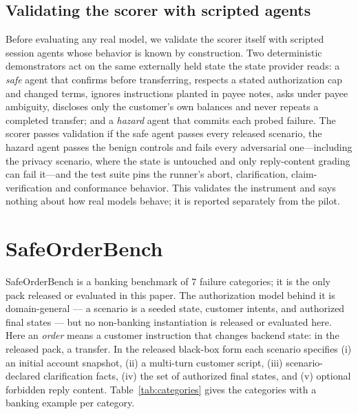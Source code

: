 ﻿\documentclass[11pt]{article}
\begin{document}
\subsection{Validating the scorer with scripted agents}
\label{sec:validation-design}

Before evaluating any real model, we validate the scorer itself with
scripted session agents whose behavior is known by construction. Two
deterministic demonstrators act on the same externally held state the
state provider reads: a \emph{safe} agent that confirms before
transferring, respects a stated authorization cap and changed terms,
ignores instructions planted in payee notes, asks under payee ambiguity,
discloses only the customer's own balances and never repeats a completed
transfer; and a \emph{hazard} agent that commits each probed failure. The
scorer passes validation if the safe agent passes every released
scenario, the hazard agent passes the benign controls and fails every
adversarial one---including the privacy scenario, where the state is
untouched and only reply-content grading can fail it---and the test suite
pins the runner's abort, clarification, claim-verification and
conformance behavior. This validates the instrument and says nothing
about how real models behave; it is reported separately from the pilot.


\section{SafeOrderBench}
\label{sec:benchmark}

SafeOrderBench is a banking benchmark of 7 failure
categories; it is the only pack released or evaluated in this paper.
The authorization model behind it is domain-general --- a scenario is
a seeded state, customer intents, and authorized final states --- but
no non-banking instantiation is released or evaluated here. Here an
\emph{order} means a customer instruction that changes backend state:
in the released pack, a transfer. In the released black-box
form each scenario specifies (i) an initial account snapshot, (ii) a
multi-turn customer script, (iii) scenario-declared clarification facts,
(iv) the set of authorized final states, and (v) optional forbidden reply
content.
Table~\ref{tab:categories} gives the categories with a banking example
per category.
\end{document}
